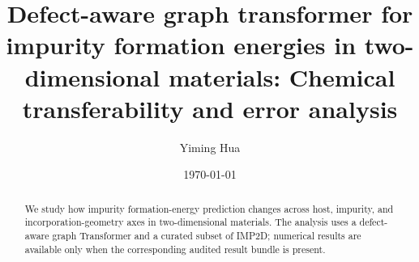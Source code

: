 \documentclass[aps,prb,reprint,superscriptaddress,floatfix,longbibliography]{revtex4-2}
\newif\ifprmresultsready
\begin{document}
\title{Defect-aware graph transformer for impurity formation energies in
two-dimensional materials: Chemical transferability and error analysis}

\author{Yiming Hua}

\date{\today}

\begin{abstract}
\ifprmresultsready
Random-split accuracy does not show how defect-energy models transfer across
chemistry or how their errors depend on incorporation geometry.  We develop
the Defect-Aware Radial Transformer (DART), an impurity-centered graph model
that combines defect-local message passing, geometric attention, and a
non-extensive gated readout.  Evaluated on 10,224 neutral impurity structures
from IMP2D, DART achieves similar errors under random and pair-held-out
evaluation, but the mean absolute error rises to 0.845 and 0.891~eV for unseen
impurities and hosts, respectively.  The host--impurity asymmetry is associated
with structural novelty after accounting for training support.  Interstitials
are more than twice as difficult as adsorbates: their errors are associated
with roomy, weakly constrained environments, whereas adsorbate errors track
chemical mismatch, particularly signed valence differences.  A readout
comparison shows that atomwise addition is poorly matched to the non-extensive
target, while defect-centered pooling avoids size-dependent drift.  For
retrospective reranking of existing DFT-relaxed IMP2D candidates,
pair-held-out predictions identify the lower-energy incorporation class with
91.4\% accuracy.  Atom-relabeling tests further show that an order-sensitive
representation can shift individual predictions by up to 8.8~eV while leaving
pooled error nearly unchanged.  Together, these results connect chemical
transfer, local defect environments, and representation correctness in
machine-learned defect energetics.
\else
We study how impurity formation-energy prediction changes across host,
impurity, and incorporation-geometry axes in two-dimensional materials.  The
analysis uses a defect-aware graph Transformer and a curated subset
of IMP2D; numerical results are available only when the corresponding audited
result bundle is present.
\fi
\end{abstract}

\maketitle
\end{document}
